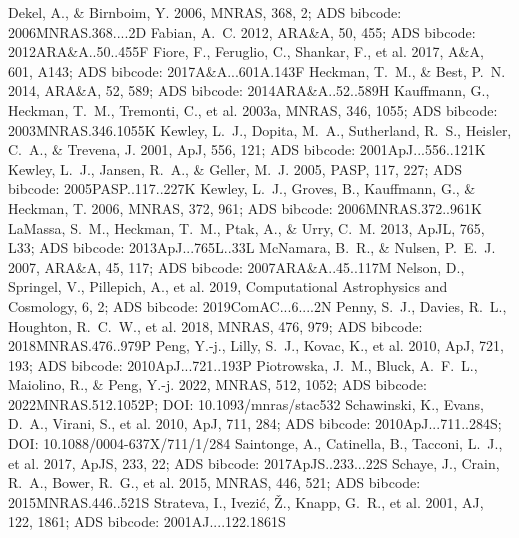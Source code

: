 \documentclass[twocolumn]{aastex631}
\begin{document}
\begin{thebibliography}{}
 Dekel, A., \& Birnboim, Y. 2006, MNRAS, 368, 2; ADS bibcode: 2006MNRAS.368....2D
 Fabian, A.~C. 2012, ARA\&A, 50, 455; ADS bibcode: 2012ARA\&A..50..455F
 Fiore, F., Feruglio, C., Shankar, F., et al. 2017, A\&A, 601, A143; ADS bibcode: 2017A\&A...601A.143F
 Heckman, T.~M., \& Best, P.~N. 2014, ARA\&A, 52, 589; ADS bibcode: 2014ARA\&A..52..589H
 Kauffmann, G., Heckman, T.~M., Tremonti, C., et al. 2003a, MNRAS, 346, 1055; ADS bibcode: 2003MNRAS.346.1055K
 Kewley, L.~J., Dopita, M.~A., Sutherland, R.~S., Heisler, C.~A., \& Trevena, J. 2001, ApJ, 556, 121; ADS bibcode: 2001ApJ...556..121K
 Kewley, L.~J., Jansen, R.~A., \& Geller, M.~J. 2005, PASP, 117, 227; ADS bibcode: 2005PASP..117..227K
 Kewley, L.~J., Groves, B., Kauffmann, G., \& Heckman, T. 2006, MNRAS, 372, 961; ADS bibcode: 2006MNRAS.372..961K
 LaMassa, S.~M., Heckman, T.~M., Ptak, A., \& Urry, C.~M. 2013, ApJL, 765, L33; ADS bibcode: 2013ApJ...765L..33L
 McNamara, B.~R., \& Nulsen, P.~E.~J. 2007, ARA\&A, 45, 117; ADS bibcode: 2007ARA\&A..45..117M
 Nelson, D., Springel, V., Pillepich, A., et al. 2019, Computational Astrophysics and Cosmology, 6, 2; ADS bibcode: 2019ComAC...6....2N
 Penny, S.~J., Davies, R.~L., Houghton, R.~C.~W., et al. 2018, MNRAS, 476, 979; ADS bibcode: 2018MNRAS.476..979P
 Peng, Y.-j., Lilly, S.~J., Kovac, K., et al. 2010, ApJ, 721, 193; ADS bibcode: 2010ApJ...721..193P
 Piotrowska, J.~M., Bluck, A.~F.~L., Maiolino, R., \& Peng, Y.-j. 2022, MNRAS, 512, 1052; ADS bibcode: 2022MNRAS.512.1052P; DOI: 10.1093/mnras/stac532
 Schawinski, K., Evans, D.~A., Virani, S., et al. 2010, ApJ, 711, 284; ADS bibcode: 2010ApJ...711..284S; DOI: 10.1088/0004-637X/711/1/284
 Saintonge, A., Catinella, B., Tacconi, L.~J., et al. 2017, ApJS, 233, 22; ADS bibcode: 2017ApJS..233...22S
 Schaye, J., Crain, R.~A., Bower, R.~G., et al. 2015, MNRAS, 446, 521; ADS bibcode: 2015MNRAS.446..521S
 Strateva, I., Ivezi{\'c}, {\v Z}., Knapp, G.~R., et al. 2001, AJ, 122, 1861; ADS bibcode: 2001AJ....122.1861S

\end{thebibliography}
\end{document}
